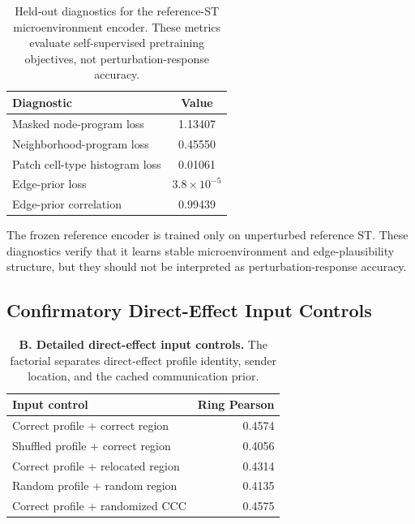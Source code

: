 \documentclass[sigconf,review,balance=false]{acmart}
\begin{document}
\begin{table}[t]
\centering
\caption{Held-out diagnostics for the reference-ST microenvironment encoder. These metrics evaluate self-supervised pretraining objectives, not perturbation-response accuracy.}
\label{tab:app_organ_prior}
\small
\setlength{\tabcolsep}{8pt}
\renewcommand{\arraystretch}{1.12}
\begin{tabular}{lc}
\toprule
Diagnostic & Value \\
\midrule
Masked node-program loss & 1.13407 \\
Neighborhood-program loss & 0.45550 \\
Patch cell-type histogram loss & 0.01061 \\
Edge-prior loss & $3.8\times10^{-5}$ \\
Edge-prior correlation & 0.99439 \\
\bottomrule
\end{tabular}
\end{table}

The frozen reference encoder is trained only on unperturbed reference ST. These diagnostics verify that it learns stable microenvironment and edge-plausibility structure, but they should not be interpreted as perturbation-response accuracy.

\subsection{Confirmatory Direct-Effect Input Controls}
\label{app:profile_controls}

\begin{table}[t]
\centering
\caption{\textbf{B. Detailed direct-effect input controls.}
The factorial separates direct-effect profile identity, sender location, and
the cached communication prior.}
\label{tab:app_profile_controls}
\vspace{2pt}
\footnotesize
\setlength{\tabcolsep}{3pt}
\renewcommand{\arraystretch}{1.08}
\begin{tabular*}{\columnwidth}{@{\extracolsep{\fill}}lr@{}}
\toprule
Input control & Ring Pearson \\
\midrule
Correct profile + correct region & 0.4574 \\
Shuffled profile + correct region & 0.4056 \\
Correct profile + relocated region & 0.4314 \\
Random profile + random region & 0.4135 \\
Correct profile + randomized CCC & 0.4575 \\
\bottomrule
\end{tabular*}
\end{table}
\end{document}
